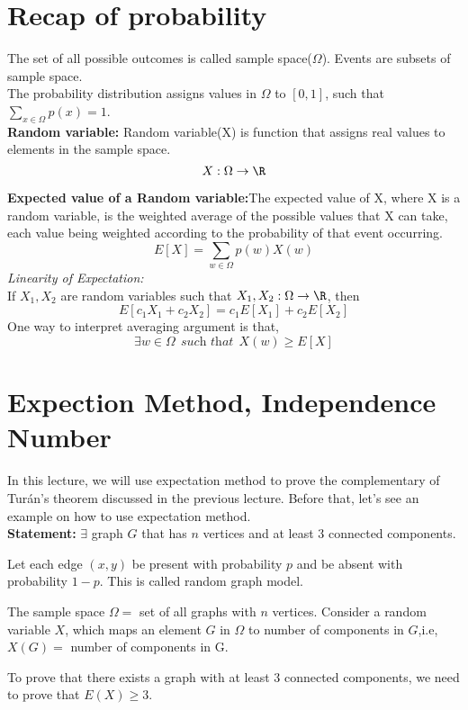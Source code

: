 \section{Recap of probability}

The set of all possible outcomes is called sample space($\Omega$). Events are subsets of sample space.\\
The probability distribution assigns values in $\Omega$ to $[0,1]$, such that 
$\sum_{x\in \Omega}p(x)=1$.\\

\textbf{Random variable:} Random variable(X) is function that assigns real values to elements in the sample space.
$$X:\Omega\rightarrow \R$$

\textbf{Expected value of a Random variable:}The expected value of X, where X is a random variable, is the weighted average of the possible values that X can take, each value being weighted according to the probability of that event occurring.
$$E[X]=\sum_{w\in \Omega}p(w)X(w)$$
\textit{Linearity of Expectation:}\\
If $X_1,X_2$ are random variables such that $X_1,X_2: \Omega \rightarrow \R$, then
$$E[c_1X_1+c_2X_2]=c_1E[X_1]+c_2E[X_2]$$
One way to interpret averaging argument is that,\\
$$\exists w\in \Omega ~~\textit{such that}~~ X(w)\ge E[X]$$

\section{Expection Method, Independence Number}
In this lecture, we will use expectation method to prove the complementary of Tur\'an’s theorem discussed in the previous lecture.
Before that, let's see an example on how to use expectation method.\\
\textbf{Statement:} $\exists$ graph $G$ that has $n$ vertices and at least 3 connected components.

Let each edge $(x,y)$ be present with probability $p$ and be absent with probability $1-p$. This is called random graph model.

The sample space $\Omega=$ set of all graphs with $n$ vertices.
Consider a random variable $X$, which maps an element $G$ in $\Omega$ to number of components in $G$,i.e, $X(G)=$ number of components in G.

To prove that there exists a graph with at least 3 connected components, we need to prove that $E(X)\ge 3$.\\

